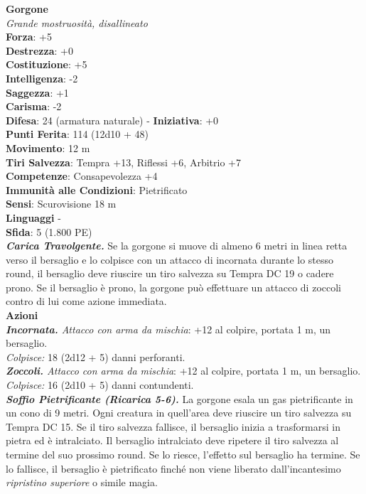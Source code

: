 \begin{multicols}{2}
\medskip\textbf{Gorgone}\\
\emph{Grande mostruosità, disallineato}\\
\textbf{Forza}: +5\\
\textbf{Destrezza}: +0\\
\textbf{Costituzione}: +5\\
\textbf{Intelligenza}: -2\\
\textbf{Saggezza}: +1\\
\textbf{Carisma}: -2\\
\textbf{Difesa}: 24 (armatura naturale) - \textbf{Iniziativa}: +0\\
\textbf{Punti Ferita}: 114 (12d10 + 48)\\
\textbf{Movimento}: 12 m\\
\textbf{Tiri Salvezza}: Tempra +13, Riflessi +6, Arbitrio +7\\
\textbf{Competenze}: Consapevolezza +4\\
\textbf{Immunità alle Condizioni}: Pietrificato\\
\textbf{Sensi}: Scurovisione 18 m\\
\textbf{Linguaggi} -\\
\textbf{Sfida}: 5 (1.800 PE)\smallskip\\
\emph{\textbf{Carica Travolgente.}} Se la gorgone si muove di almeno 6 metri in linea retta verso il bersaglio e lo colpisce con un attacco di incornata durante lo stesso round, il bersaglio deve riuscire un tiro salvezza su Tempra DC  19 o cadere prono. Se il bersaglio è prono, la gorgone può effettuare un attacco di zoccoli contro di lui come azione immediata.\\
\smallskip\textbf{Azioni}\\
\emph{\textbf{Incornata.} Attacco con arma da mischia}: +12 al colpire, portata 1 m, un bersaglio.\\
\emph{Colpisce:} 18 (2d12 + 5) danni perforanti.\\
\emph{\textbf{Zoccoli.} Attacco con arma da mischia}: +12 al colpire, portata 1 m, un bersaglio.\\
\emph{Colpisce:} 16 (2d10 + 5) danni contundenti.\\
\emph{\textbf{Soffio Pietrificante (Ricarica 5-6).}} La gorgone esala un gas pietrificante in un cono di 9 metri. Ogni creatura in quell'area deve riuscire un tiro salvezza su Tempra DC  15. Se il tiro salvezza fallisce, il bersaglio inizia a trasformarsi in pietra ed è intralciato. Il bersaglio intralciato deve ripetere il tiro salvezza al termine del suo prossimo round. Se lo riesce, l'effetto sul bersaglio ha termine. Se lo fallisce, il bersaglio è pietrificato finché non viene liberato dall'incantesimo \emph{ripristino superiore} o simile magia.\\

\end{multicols}
